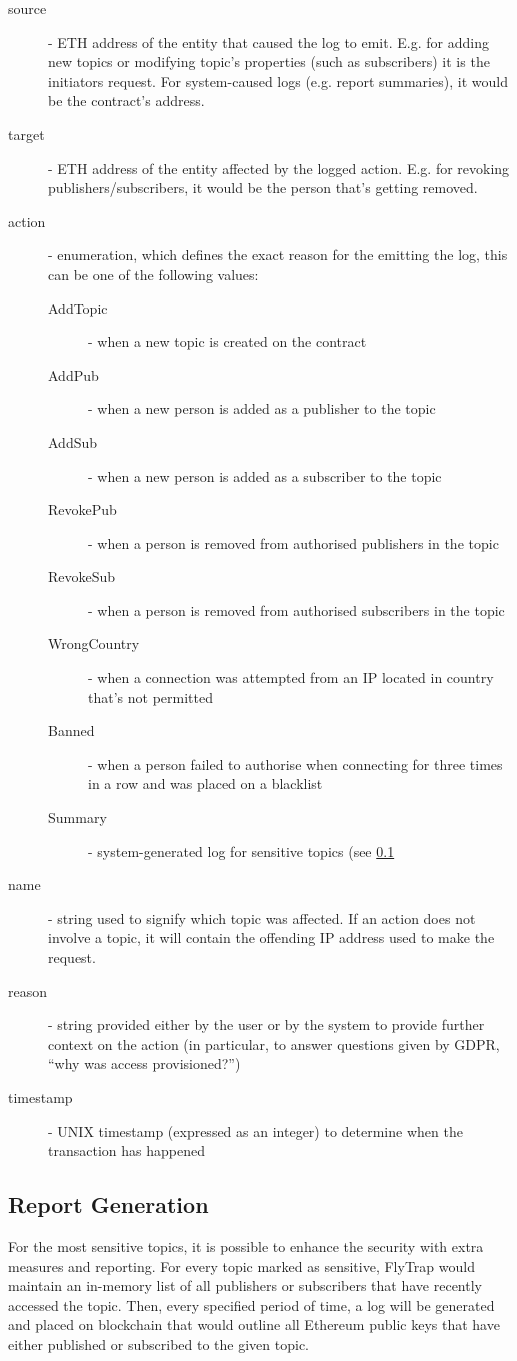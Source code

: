 \begin{description}
    \item[source] - ETH address of the entity that caused the log to emit. E.g. for adding new topics or modifying topic's properties (such as subscribers) it is the initiators request. For system-caused logs (e.g. report summaries), it would be the contract's address.
    \item[target] - ETH address of the entity affected by the logged action. E.g. for revoking publishers/subscribers, it would be the person that's getting removed.
    \item[action] - enumeration, which defines the exact reason for the emitting the log, this can be one of the following values:
    \begin{description}
        \item[AddTopic] - when a new topic is created on the contract
        \item[AddPub] - when a new person is added as a publisher to the topic
        \item[AddSub] - when a new person is added as a subscriber to the topic
        \item[RevokePub] - when a person is removed from authorised publishers in the topic
        \item[RevokeSub] - when a person is removed from authorised subscribers in the topic
        \item[WrongCountry] - when a connection was attempted from an IP located in country that's not permitted
        \item[Banned] - when a person failed to authorise when connecting for three times in a row and was placed on a blacklist
        \item[Summary] - system-generated log for sensitive topics (see \ref{sec:reports}
    \end{description}
    \item[name] - string used to signify which topic was affected. If an action does not involve a topic, it will contain the offending IP address used to make the request.
    \item[reason] - string provided either by the user or by the system to provide further context on the action (in particular, to answer questions given by GDPR, ``why was access provisioned?'')
    \item[timestamp] - UNIX timestamp (expressed as an integer) to determine when the transaction has happened
\end{description}
\subsection{Report Generation}\label{sec:reports}
For the most sensitive topics, it is possible to enhance the security with extra measures and reporting. For every topic marked as sensitive, FlyTrap would maintain an in-memory list of all publishers or subscribers that have recently accessed the topic. Then, every specified period of time, a log will be generated and placed on blockchain that would outline all Ethereum public keys that have either published or subscribed to the given topic.


